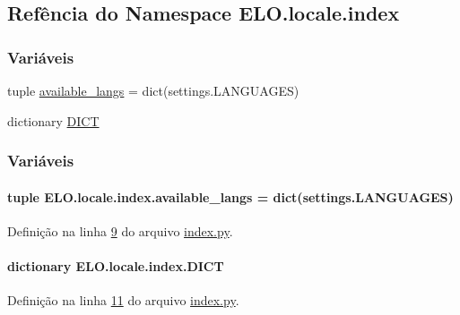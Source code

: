 \hypertarget{namespaceELO_1_1locale_1_1index}{\subsection{Refência do Namespace E\-L\-O.\-locale.\-index}
\label{namespaceELO_1_1locale_1_1index}
}
\subsubsection*{Variáveis}
\begin{DoxyCompactItemize}
\item 
tuple \hyperlink{namespaceELO_1_1locale_1_1index_ab62adb4738ab68b1693adb90951d92a9}{available\-\_\-langs} = dict(settings.\-L\-A\-N\-G\-U\-A\-G\-E\-S)
\item 
dictionary \hyperlink{namespaceELO_1_1locale_1_1index_a065d26641ba89f86fe642e3858607087}{D\-I\-C\-T}
\end{DoxyCompactItemize}


\subsubsection{Variáveis}
\hypertarget{namespaceELO_1_1locale_1_1index_ab62adb4738ab68b1693adb90951d92a9}{
\paragraph[{available\-\_\-langs}]{\setlength{\rightskip}{0pt plus 5cm}tuple E\-L\-O.\-locale.\-index.\-available\-\_\-langs = dict(settings.\-L\-A\-N\-G\-U\-A\-G\-E\-S)}}\label{namespaceELO_1_1locale_1_1index_ab62adb4738ab68b1693adb90951d92a9}


Definição na linha \hyperlink{index_8py_source_l00009}{9} do arquivo \hyperlink{index_8py_source}{index.\-py}.

\hypertarget{namespaceELO_1_1locale_1_1index_a065d26641ba89f86fe642e3858607087}{
\paragraph[{D\-I\-C\-T}]{\setlength{\rightskip}{0pt plus 5cm}dictionary E\-L\-O.\-locale.\-index.\-D\-I\-C\-T}}\label{namespaceELO_1_1locale_1_1index_a065d26641ba89f86fe642e3858607087}


Definição na linha \hyperlink{index_8py_source_l00011}{11} do arquivo \hyperlink{index_8py_source}{index.\-py}.

